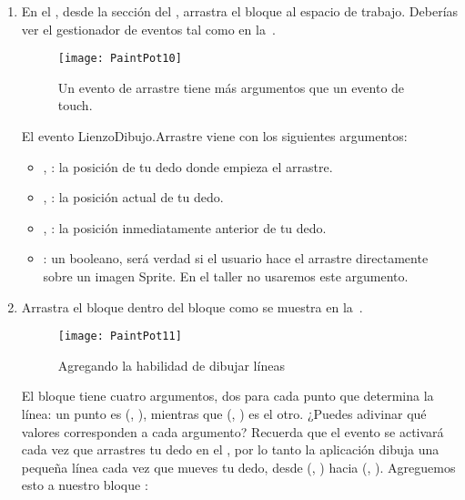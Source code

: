 \begin{enumerate}
	
\item En el \blockEditor, desde la sección del
  , arrastra el bloque
   al espacio de trabajo. Deberías
  ver el gestionador de eventos tal como en la~.

\begin{figure}[H]
\centering
\texttt{[image: PaintPot10]}
\caption{Un evento de arrastre tiene más argumentos que un evento de touch.}
\label{fig:PaintPot10}
\end{figure}

El evento LienzoDibujo.Arrastre viene con los siguientes argumentos:

\begin{itemize}

\item {}, : la posición de tu
  dedo donde empieza el arrastre.

\item {}, : la posición actual de
  tu dedo.

\item {}, : la posición
  inmediatamente anterior de tu dedo.

\item {}: un booleano, será verdad si el
  usuario hace el arrastre directamente sobre un imagen Sprite. En el
  taller no usaremos este argumento.

\end{itemize}

\item Arrastra el bloque  dentro
  del bloque  como se muestra en
  la~.

\begin{figure}[H]
\centering
\texttt{[image: PaintPot11]}
\caption{Agregando la habilidad de dibujar líneas}
\label{fig:PaintPot11}
\end{figure}

El bloque  tiene cuatro argumentos,
dos para cada punto que determina la línea: un punto es
(, ), mientras que
(, ) es el otro. ¿Puedes adivinar qué
valores corresponden a cada argumento?  Recuerda que el evento
 se activará cada vez que arrastres
tu dedo en el \viewer, por lo tanto la aplicación dibuja una pequeña
línea cada vez que mueves tu dedo, desde
(, ) hacia
(, ). Agreguemos esto a nuestro
bloque :


\end{enumerate}
